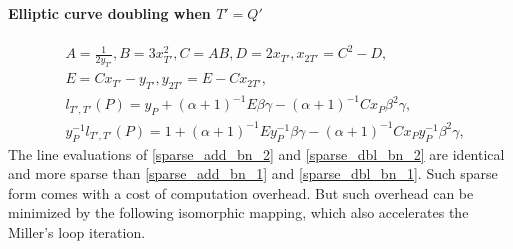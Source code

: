\paragraph*{Elliptic curve doubling when $T'=Q'$}
\begin{subequations}
	\begin{eqnarray}
		&A=\frac{1}{2y_{T'}}, B=3x_{T'}^2, C=AB, D=2x_{T'}, x_{2T'}=C^2-D,\nonumber\\
		& E= Cx_{T'}-y_{T'}, y_{2T'}=E-Cx_{2T'},\nonumber\\
		&l_{T',T'}(P)= y_P+(\alpha+1)^{-1}E\beta\gamma-(\alpha+1)^{-1}Cx_P\beta^2 \gamma, \label{sparse_dbl_bn_1} \\
		&y_{P}^{-1}l_{T',T'}(P)= 1+(\alpha+1)^{-1}Ey_{P}^{-1}\beta\gamma-(\alpha+1)^{-1}Cx_Py_{P}^{-1}\beta^2 \gamma, \label{sparse_dbl_bn_2}
	\end{eqnarray}
\end{subequations}
The line evaluations of \eqref{sparse_add_bn_2} and \eqref{sparse_dbl_bn_2} are identical and more sparse than \eqref{sparse_add_bn_1} and \eqref{sparse_dbl_bn_1}. Such sparse form comes with a cost of computation overhead. But such overhead can be minimized by the following isomorphic mapping, which also accelerates the Miller's loop iteration.
